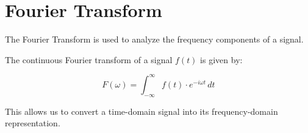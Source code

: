 
\section{Fourier Transform}

The Fourier Transform is used to analyze the frequency components of a signal.

The continuous Fourier transform of a signal \( f(t) \) is given by:

\[
F(\omega) = \int_{-\infty}^{\infty} f(t) \cdot e^{-i \omega t} \, dt
\]

This allows us to convert a time-domain signal into its frequency-domain representation.
